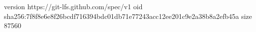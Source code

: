 version https://git-lfs.github.com/spec/v1
oid sha256:7f8f8e6e8f26bcdf716394bdc01db71e77243acc12ee201c9e2a38b8a2efb45a
size 87560
